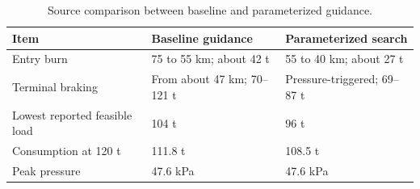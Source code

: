 \begin{table}[htbp]
\caption{Source comparison between baseline and parameterized guidance.}
\label{tab:src15}
\small
\setlength{\tabcolsep}{3.5pt}
\begin{tabularx}{\linewidth}{@{}p{.34\linewidth}XX@{}}
\toprule
Item & Baseline guidance & Parameterized search \\
\midrule
Entry burn & 75 to 55 km; about 42 t & 55 to 40 km; about 27 t \\
Terminal braking & From about 47 km; 70--121 t & Pressure-triggered; 69--87 t \\
Lowest reported feasible load & 104 t & 96 t \\
Consumption at 120 t & 111.8 t & 108.5 t \\
Peak pressure & 47.6 kPa & 47.6 kPa \\
\bottomrule
\end{tabularx}
\end{table}
